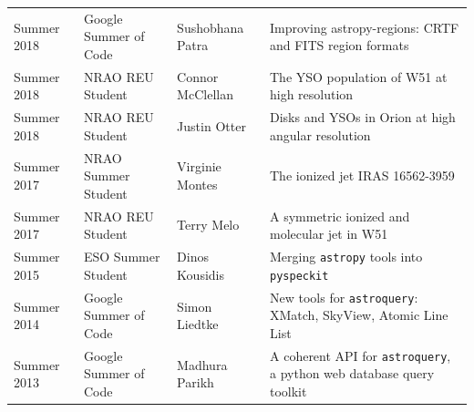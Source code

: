 \begin{minipage}{\textwidth}
\begin{tabular}{p{0.85in}p{1.3in}lp{2.6in}}
    Summer 2018 & Google Summer of Code &  Sushobhana Patra    &  Improving astropy-regions: CRTF and FITS region formats \\
    Summer 2018 & NRAO REU Student &       Connor McClellan    &  The YSO population of W51 at high resolution \\
    Summer 2018 & NRAO REU Student &       Justin Otter    &  Disks and YSOs in Orion at high angular resolution \\
    Summer 2017 & NRAO Summer Student &    Virginie Montes    &  The ionized jet IRAS 16562-3959 \\
    Summer 2017 & NRAO REU Student &       Terry Melo    &  A symmetric ionized and molecular jet in W51 \\
    Summer 2015 & ESO Summer Student &     Dinos Kousidis    &  Merging \texttt{astropy} tools into \texttt{pyspeckit} \\
    Summer 2014 & Google Summer of Code &  Simon Liedtke    &  New tools for \texttt{astroquery}: XMatch, SkyView, Atomic Line List \\
    Summer 2013 & Google Summer of Code &  Madhura Parikh   &  A coherent API for \texttt{astroquery}, a python web database query toolkit \\
\end{tabular}
\end{minipage}

\vspace{4mm}
